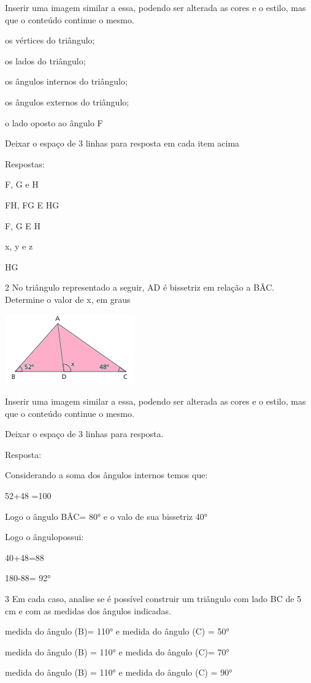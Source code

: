 Inserir uma imagem similar a essa, podendo ser alterada as cores e o
estilo, mas que o conteúdo continue o mesmo.

\item os vértices do triângulo;
\item os lados do triângulo;
\item os ângulos internos do triângulo;
\item os ângulos externos do triângulo;
\item o lado oposto ao ângulo F

Deixar o espaço de 3 linhas para resposta em cada item acima

Respostas:

\item F, G e H
\item FH, FG E HG
\item F, G E H
\item x, y e z
\item HG

\num{2} No triângulo representado a seguir, AD é bissetriz em relação a BÂC.
Determine o valor de x, em graus

\includegraphics[width=2\times 20833in,height=1\times 1875in]{./imgSAEB_8_MAT/media/image14.png}

Inserir uma imagem similar a essa, podendo ser alterada as cores e o
estilo, mas que o conteúdo continue o mesmo.

Deixar o espaço de 3 linhas para resposta.

Resposta:

Considerando a soma dos ângulos internos temos que:

52+48 =100

Logo o ângulo BÂC= 80° e o valo de sua bissetriz 40°

Logo o ângulo\times possui:

40+48=88

180-88= 92°

\num{3} Em cada caso, analise se é possível construir um triângulo com lado
BC de 5 cm e com as medidas dos ângulos indicadas.

\item medida do ângulo (B)= 110° e medida do ângulo (C) = 50°
\item medida do ângulo (B) = 110° e medida do ângulo (C)= 70°
\item medida do ângulo (B) = 110° e medida do ângulo (C) = 90°

